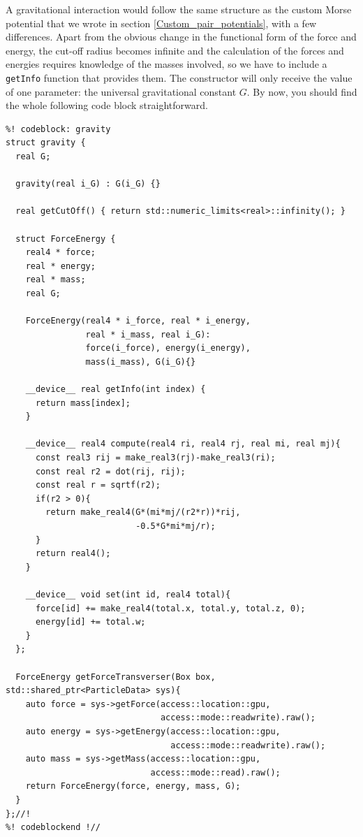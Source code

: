 A gravitational interaction would follow the same structure as the custom Morse 
potential that we wrote in section \ref{Custom_pair_potentials}, with a few 
differences. Apart from the obvious change in the functional form of the force 
and energy, the cut-off radius becomes infinite and the calculation of the 
forces and energies requires knowledge of the masses involved, so we have to 
include a \texttt{getInfo} function that provides them. The constructor will 
only receive the value of one parameter: the universal gravitational constant 
$G$. By now, you should find the whole following code block straightforward.
\begin{lstlisting}
%! codeblock: gravity
struct gravity {
  real G;

  gravity(real i_G) : G(i_G) {}

  real getCutOff() { return std::numeric_limits<real>::infinity(); }

  struct ForceEnergy {
    real4 * force;
    real * energy;
    real * mass;
    real G;

    ForceEnergy(real4 * i_force, real * i_energy,
                real * i_mass, real i_G):
                force(i_force), energy(i_energy),
                mass(i_mass), G(i_G){}

    __device__ real getInfo(int index) {
      return mass[index];
    }

    __device__ real4 compute(real4 ri, real4 rj, real mi, real mj){
      const real3 rij = make_real3(rj)-make_real3(ri);
      const real r2 = dot(rij, rij);
      const real r = sqrtf(r2);
      if(r2 > 0){
        return make_real4(G*(mi*mj/(r2*r))*rij,
                          -0.5*G*mi*mj/r);
      }
      return real4();
    }

    __device__ void set(int id, real4 total){
      force[id] += make_real4(total.x, total.y, total.z, 0);
      energy[id] += total.w;
    }
  };

  ForceEnergy getForceTransverser(Box box, std::shared_ptr<ParticleData> sys){
    auto force = sys->getForce(access::location::gpu,
                               access::mode::readwrite).raw();
    auto energy = sys->getEnergy(access::location::gpu,
                                 access::mode::readwrite).raw();
    auto mass = sys->getMass(access::location::gpu,
                             access::mode::read).raw();
    return ForceEnergy(force, energy, mass, G);
  }
};//!
%! codeblockend !//
\end{lstlisting}

